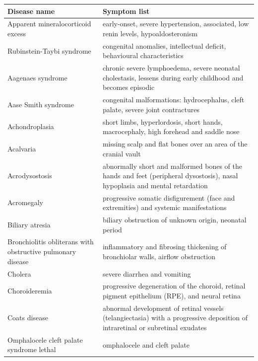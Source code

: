 \begin{table}[H]
  \begin{scriptsize}
    \begin{tabular}{| p{6cm} | p{6.5cm} |}
      \hline
      Disease name & Symptom list \\
      \hline
      Apparent mineralocorticoid excess & early-onset, severe hypertension, associated, low renin levels, hypoaldosteronism \\
      \hline
      Rubinstein-Taybi syndrome & congenital anomalies, intellectual deficit, behavioural characteristics \\
      \hline
      Aagenaes syndrome & chronic severe lymphoedema, severe neonatal cholestasis, lessens during early childhood and becomes episodic \\
      \hline
      Aase Smith syndrome & congenital malformations: hydrocephalus, cleft palate, severe joint contractures \\
      \hline
      Achondroplasia & short limbs, hyperlordosis, short hands, macrocephaly, high forehead and saddle nose \\
      \hline
      Acalvaria & missing scalp and flat bones over an area of the cranial vault \\
      \hline
      Acrodysostosis & abnormally short and malformed bones of the hands and feet (peripheral dysostosis), nasal hypoplasia and mental retardation \\
      \hline
      Acromegaly & progressive somatic disfigurement (face and extremities) and systemic manifestations \\
      \hline
      Biliary atresia & biliary obstruction of unknown origin, neonatal period \\
      \hline
      Bronchiolitis obliterans with obstructive pulmonary disease & inflammatory and fibrosing thickening of bronchiolar walls, airflow obstruction \\
      \hline
      Cholera & severe diarrhea and vomiting \\
      \hline
      Choroideremia & progressive degeneration of the choroid, retinal pigment epithelium (RPE), and neural retina \\
      \hline
      Coats disease & abnormal development of retinal vessels (telangiectasia) with a progressive deposition of intraretinal or subretinal exudates \\
      \hline
      Omphalocele cleft palate syndrome lethal & omphalocele and cleft palate \\

\end{tabular}
\end{scriptsize}
\end{table}
